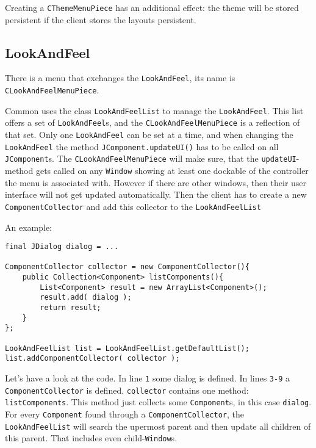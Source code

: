 \documentclass[a4paper,10pt]{article}
\newcommand{\src}[1]{\lstinline[basicstyle=\ttfamily]|#1|}
\begin{document}
Creating a \src{CThemeMenuPiece} has an additional effect: the theme will be stored persistent if the client stores the layouts persistent.

\subsection{LookAndFeel}
There is a menu that exchanges the \src{LookAndFeel}, its name is \\\src{CLookAndFeelMenuPiece}.

Common uses the class \src{LookAndFeelList} to manage the \src{LookAndFeel}. This list offers a set of \src{LookAndFeel}s, and the \src{CLookAndFeelMenuPiece} is a reflection of that set. Only one \src{LookAndFeel} can be set at a time, and when changing the \src{LookAndFeel} the method \src{JComponent.updateUI()} has to be called on all \src{JComponent}s. The \src{CLookAndFeelMenuPiece} will make sure, that the \src{updateUI}-method gets called on any \src{Window} showing at least one dockable of the controller the menu is associated with. However if there are other windows, then their user interface will not get updated automatically. Then the client has to create a new \src{ComponentCollector} and add this collector to the \src{LookAndFeelList}

An example:
\begin{lstlisting}
final JDialog dialog = ...

ComponentCollector collector = new ComponentCollector(){
	public Collection<Component> listComponents(){
		List<Component> result = new ArrayList<Component>();
		result.add( dialog );
		return result;
	}
};

LookAndFeelList list = LookAndFeelList.getDefaultList();
list.addComponentCollector( collector );
\end{lstlisting}
Let's have a look at the code. In line \src{1} some dialog is defined. In lines \src{3-9} a \src{ComponentCollector} is defined. \src{collector} contains one method: \\\src{listComponents}. This method just collects some \src{Component}s, in this case \src{dialog}. For every \src{Component} found through a \src{ComponentCollector}, the \\\src{LookAndFeelList} will search the upermost parent and then update all children of this parent. That includes even child-\src{Window}s.
\end{document}
